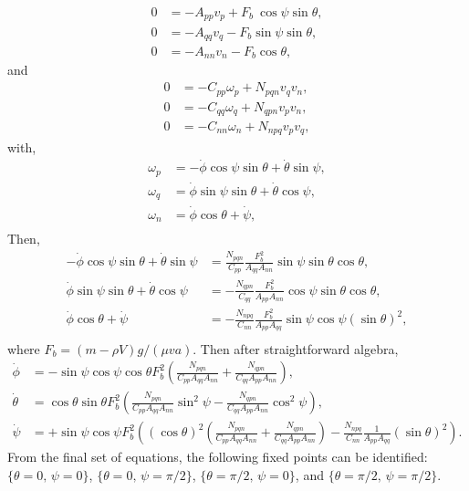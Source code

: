 \documentclass[12pt]{My_preprint}
\begin{document}
\begin{align}
    0 &= -A_{pp} v_p + F_b\ \cos \psi \sin \theta, \label{eq:vp}\\
    0 &= -A_{qq} v_q - F_b\sin \psi \sin \theta,
\label{eq:vq} \\
   0 &= -A_{nn} v_n - F_b\cos \theta,
\label{eq:vn}
\end{align}
and
\begin{align}
    0 &= -C_{pp} \omega_p + N_{pqn} v_q v_n, \label{eq:omp}\\
    0 &= -C_{qq} \omega_q + N_{qpn} v_p v_n, \label{eq:omq} \\
   0 &= -C_{nn} \omega_n + N_{npq} v_p v_q,\label{eq:omn}
\end{align}
with,
\begin{align}
  \omega_p &= -\dot \phi \cos \psi \sin \theta +  \dot \theta \sin \psi, \\
  \omega_q &= \dot \phi \sin \psi \sin \theta +  \dot \theta \cos \psi, \\
  \omega_n &= \dot \phi \cos \theta +  \dot \psi, \\
\end{align}
Then,
\begin{align}
  -\dot \phi \cos \psi \sin \theta +  \dot \theta \sin \psi &= \frac{N_{pqn}}{C_{pp}} \frac{F_b^2}{A_{qq} A_{nn}}\sin \psi \sin \theta\cos \theta, \\
  \dot \phi \sin \psi \sin \theta +  \dot \theta \cos \psi &= -\frac{N_{qpn}}{C_{qq}} \frac{F_b^2}{A_{pp} A_{nn}}\cos \psi \sin \theta\cos \theta, \\
    \dot \phi \cos \theta +  \dot \psi &= -\frac{N_{npq}}{C_{nn}}\frac{F_b^2}{A_{pp} A_{qq}}\sin \psi \cos \psi (\sin \theta) ^2,\\
\end{align}
where $F_b = (m-\rho V)g/(\mu v a)$.
Then after straightforward algebra,
\begin{align}
    \dot \phi  &= -\sin \psi \cos \psi  \cos \theta F_b^2 \left(\frac{N_{pqn}}{C_{pp}A_{qq} A_{nn}}+\frac{N_{qpn}}{C_{qq}A_{pp} A_{nn}}\right), \\
    \dot \theta  &= \cos \theta \sin \theta F_b^2 \left(\frac{N_{pqn}}{C_{pp}A_{qq} A_{nn}}\sin^2 \psi - \frac{N_{qpn}}{C_{qq}A_{pp} A_{nn}}\cos^2 \psi\right), \\
    \dot \psi   &= +\sin \psi \cos \psi F_b^2 \left((\cos \theta)^2\left(\frac{N_{pqn}}{C_{pp}A_{qq} A_{nn}}+\frac{N_{qpn}}{C_{qq}A_{pp} A_{nn}}\right)-\frac{N_{npq}}{C_{nn}}\frac{1}{A_{pp} A_{qq}}(\sin \theta) ^2\right).
\end{align}
From the final set of equations, the following fixed points can be identified:
$\{\theta = 0, \, \psi = 0\}$, $\{\theta = 0, \, \psi = \pi/2\}$, $\{\theta = \pi/2, \, \psi = 0\}$, and $\{\theta = \pi/2, \, \psi = \pi/2\}$.
\end{document}
